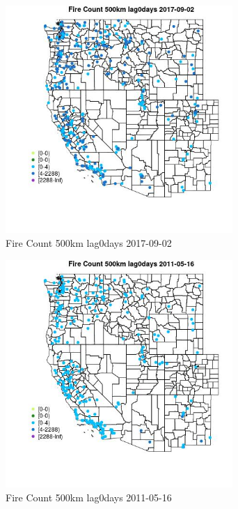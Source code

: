 \begin{figure} 
\centering  
\includegraphics[width=0.77\textwidth]{Code_Outputs/Report_ML_input_PM25_Step4_part_e_de_duplicated_aves_compiled_2019-05-20wNAs_MapObsFire_Count_500km_lag0days2017-09-02.jpg} 
\caption{\label{fig:Report_ML_input_PM25_Step4_part_e_de_duplicated_aves_compiled_2019-05-20wNAsMapObsFire_Count_500km_lag0days2017-09-02}Fire Count 500km lag0days 2017-09-02} 
\end{figure} 
 

\begin{figure} 
\centering  
\includegraphics[width=0.77\textwidth]{Code_Outputs/Report_ML_input_PM25_Step4_part_e_de_duplicated_aves_compiled_2019-05-20wNAs_MapObsFire_Count_500km_lag0days2011-05-16.jpg} 
\caption{\label{fig:Report_ML_input_PM25_Step4_part_e_de_duplicated_aves_compiled_2019-05-20wNAsMapObsFire_Count_500km_lag0days2011-05-16}Fire Count 500km lag0days 2011-05-16} 
\end{figure} 
 

